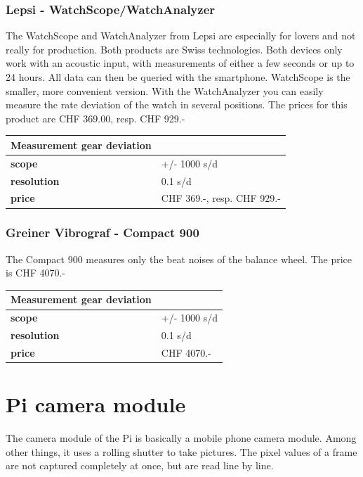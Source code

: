 \documentclass[12pt, a4paper]{report}
\begin{document}
\subsubsection{Lepsi - WatchScope/WatchAnalyzer}
The WatchScope and WatchAnalyzer from Lepsi are especially for lovers and not really for production. Both products are Swiss technologies. Both devices only work with an acoustic input, with measurements of either a few seconds or up to 24 hours. All data can then be queried with the smartphone. WatchScope is the smaller, more convenient version. With the WatchAnalyzer you can easily measure the rate deviation of the watch in several positions. The prices for this product are CHF 369.00, resp. CHF 929.-

\bigskip

\begin{tabularx}{\textwidth}{>{\bfseries}lX}
Measurement gear deviation & \\\toprule
scope & +/- 1000 s/d \\\midrule
resolution & 0.1 s/d\\\midrule
price & CHF 369.-, resp. CHF 929.-\\\bottomrule
\end{tabularx}


\subsubsection{Greiner Vibrograf - Compact 900}
The Compact 900 measures only the beat noises of the balance wheel. The price is CHF 4070.-

\bigskip

\begin{tabularx}{\textwidth}{>{\bfseries}lX}
Measurement gear deviation & \\\toprule
scope & +/- 1000 s/d \\\midrule
resolution & 0.1 s/d\\\midrule
price & CHF 4070.-\\\bottomrule
\end{tabularx}

\section{Pi camera module}

The camera module of the Pi is basically a mobile phone camera module. Among other things, it uses a rolling shutter to take pictures. The pixel values of a frame are not captured completely at once, but are read line by line.
\end{document}
